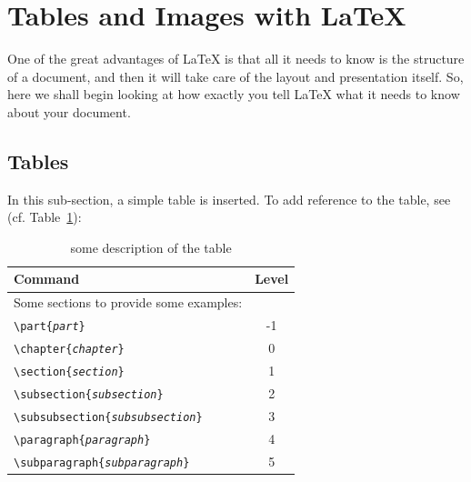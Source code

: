 \section{Tables and Images with \LaTeX}
One of the great advantages of \LaTeX{} is that all it needs to know is
the structure of a document, and then it will take care of the layout
and presentation itself.  So, here we shall begin looking at how exactly
you tell \LaTeX{} what it needs to know about your document.

\subsection{Tables}
In this sub-section, a simple table is inserted. To add reference to the table, see (cf. Table~\hyperref[tab:tableexample0]{\ref{tab:tableexample0}}):

\begin{table}[htb]
	\begin{tabular}{|b{7cm}|c|}
		
		\hline  %
		\fontsize{11pt}{12pt}\selectfont Command & Level \\ \hline  %
		\fontsize{10pt}{14pt}\selectfont Some sections to provide some examples: & \\
		\texttt{\textbackslash part\{\emph{part}\}} & -1 \\
		\texttt{\textbackslash chapter\{\emph{chapter}\}} & 0 \\
		\texttt{\textbackslash section\{\emph{section}\}} & 1 \\
		\texttt{\textbackslash subsection\{\emph{subsection}\}} & 2 \\
		\texttt{\textbackslash subsubsection\{\emph{subsubsection}\}} & 3 \\
		\texttt{\textbackslash paragraph\{\emph{paragraph}\}} & 4 \\
		\texttt{\textbackslash subparagraph\{\emph{subparagraph}\}} & 5 \\
		\hline
		
	\end{tabular}
	\caption{some description of the table}
	\label{tab:tableexample0}
\end{table}

